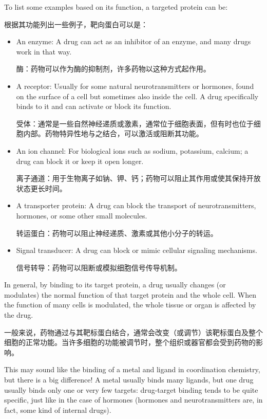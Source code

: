 \documentclass[dvipsnames, svgnames,a4paper,11pt]{article}
\begin{document}
To list some examples based on its function, a targeted protein can be:

根据其功能列出一些例子，靶向蛋白可以是：
\begin{itemize}

      \item An enzyme: A drug can act as an inhibitor of an enzyme, and many drugs work in that way.

            酶：药物可以作为酶的抑制剂，许多药物以这种方式起作用。

      \item A receptor: Usually for some natural neurotransmitters or hormones, found on the surface of a cell but sometimes also inside the cell. A drug specifically binds to it and can activate or block its function.

            受体：通常是一些自然神经递质或激素，通常位于细胞表面，但有时也位于细胞内部。药物特异性地与之结合，可以激活或阻断其功能。

      \item An ion channel: For biological ions such as sodium, potassium, calcium; a drug can block it or keep it open longer.

            离子通道：用于生物离子如钠、钾、钙；药物可以阻止其作用或使其保持开放状态更长时间。

      \item A transporter protein: A drug can block the transport of neurotransmitters, hormones, or some other small molecules.

            转运蛋白：药物可以阻止神经递质、激素或其他小分子的转运。

      \item Signal transducer: A drug can block or mimic cellular signaling mechanisms.

            信号转导：药物可以阻断或模拟细胞信号传导机制。

\end{itemize}

In general, by binding to its target protein, a drug usually changes (or modulates) the normal function of that target protein and the whole cell. When the function of many cells is modulated, the whole tissue or organ is affected by the drug.

一般来说，药物通过与其靶标蛋白结合，通常会改变（或调节）该靶标蛋白及整个细胞的正常功能。当许多细胞的功能被调节时，整个组织或器官都会受到药物的影响。

This may sound like the binding of a metal and ligand in coordination chemistry, but there is a big difference! A metal usually binds many ligands, but one drug usually binds only one or very few targets: drug-target binding tends to be quite specific, just like in the case of hormones (hormones and neurotransmitters are, in fact, some kind of internal drugs).
\end{document}
